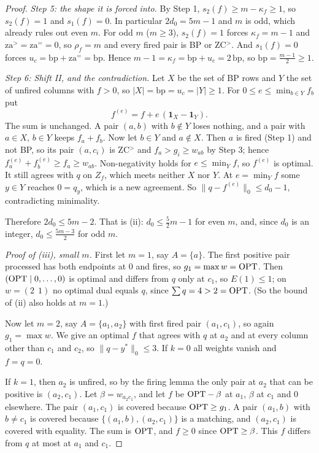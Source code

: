 \begin{proof}
\emph{Step 5: the shape it is forced into.} By Step 1, $s_2(f) \ge m-\kappa_f \ge 1$, so
$s_2(f) = 1$ and $s_1(f) = 0$. In particular $2d_0 = 5m-1$ and $m$ is odd, which already rules
out even $m$. For odd $m$ ($m \ge 3$), $s_2(f) = 1$ forces $\kappa_f = m-1$ and
$\mathrm{za}^> = \mathrm{za}^= = 0$, so $\rho_f = m$ and every fired pair is BP or ZC$^>$. And
$s_1(f) = 0$ forces $u_c = \mathrm{bp}+\mathrm{za}^= = \mathrm{bp}$. Hence
$m-1 = \kappa_f = \mathrm{bp}+u_c = 2\,\mathrm{bp}$, so $\mathrm{bp} = \tfrac{m-1}{2} \ge 1$.

\emph{Step 6: Shift II, and the contradiction.} Let $X$ be the set of BP rows and $Y$ the set of
unfired columns with $f > 0$, so $|X| = \mathrm{bp} = u_c = |Y| \ge 1$. For
$0 \le e \le \min_{b \in Y} f_b$ put
\begin{equation}\label{eq:shifttwo}
  f^{(e)} = f + e\,(\mathbf{1}_X - \mathbf{1}_Y) .
\end{equation}
The sum is unchanged. A pair $(a,b)$ with $b \notin Y$ loses nothing, and a pair with $a \in X$,
$b \in Y$ keeps $f_a+f_b$. Now let $b \in Y$ and $a \notin X$. Then $a$ is fired (Step 1) and not
BP, so its pair $(a,c_i)$ is ZC$^>$ and $f_a > g_i \ge w_{ab}$ by Step 3; hence
$f^{(e)}_a + f^{(e)}_b \ge f_a \ge w_{ab}$. Non-negativity holds for $e \le \min_Y f$, so
$f^{(e)}$ is optimal. It still agrees with $q$ on $Z_f$, which meets neither $X$ nor $Y$. At
$e = \min_Y f$ some $y \in Y$ reaches $0 = q_y$, which is a new agreement. So
$\|q-f^{(e)}\|_0 \le d_0-1$, contradicting minimality.

Therefore $2d_0 \le 5m-2$. That is (ii): $d_0 \le \tfrac52 m - 1$ for even $m$, and, since $d_0$
is an integer, $d_0 \le \tfrac{5m-3}{2}$ for odd $m$.

\emph{Proof of (iii), small $m$.} First let $m = 1$, say $A = \{a\}$. The first positive pair
processed has both endpoints at $0$ and fires, so $g_1 = \max w = \mathrm{OPT}$. Then
$(\mathrm{OPT} \mid 0,\dots,0)$ is optimal and differs from $q$ only at $c_1$, so $E(1) \le 1$; on
$w = (2\ \ 1)$ no optimal dual equals $q$, since $\sum q = 4 > 2 = \mathrm{OPT}$. (So the bound of (ii)
also holds at $m = 1$.)

Now let $m = 2$, say $A = \{a_1,a_2\}$ with first fired pair $(a_1,c_1)$, so again $g_1 = \max w$.
We give an optimal $f$ that agrees with $q$ at $a_2$ and at every column other than $c_1$ and $c_2$,
so $\|q-y^*\|_0 \le 3$. If $k = 0$ all weights vanish and $f = q = 0$.

If $k = 1$, then $a_2$ is unfired, so by the firing lemma the only pair at $a_2$ that can be
positive is $(a_2,c_1)$. Let $\beta = w_{a_2c_1}$, and let $f$ be $\mathrm{OPT}-\beta$ at $a_1$, $\beta$
at $c_1$ and $0$ elsewhere. The pair $(a_1,c_1)$ is covered because $\mathrm{OPT} \ge g_1$. A pair
$(a_1,b)$ with $b \ne c_1$ is covered because $\{(a_1,b),(a_2,c_1)\}$ is a matching, and
$(a_2,c_1)$ is covered with equality. The sum is $\mathrm{OPT}$, and $f \ge 0$ since
$\mathrm{OPT} \ge \beta$. This $f$ differs from $q$ at most at $a_1$ and $c_1$.


\end{proof}
